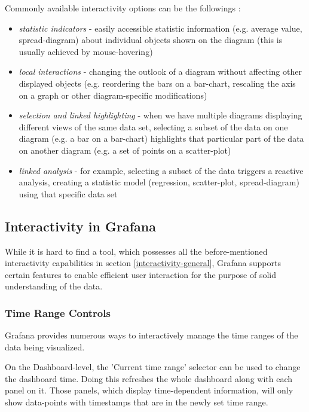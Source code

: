 Commonly available interactivity options can be the followings \cite{visual-analysis}:
\begin{itemize}
	\item \emph{statistic indicators} - easily accessible statistic information (e.g. average value, spread-diagram) about individual objects shown on the diagram (this is usually achieved by mouse-hovering)
	\item \emph{local interactions} - changing the outlook of a diagram without affecting other displayed objects (e.g. reordering the bars on a bar-chart, rescaling the axis on a graph or other diagram-specific modifications)
	\item \emph{selection and linked highlighting} - when we have multiple diagrams displaying different views of the same data set, selecting a subset of the data on one diagram (e.g. a bar on a bar-chart) highlights that particular part of the data on another diagram (e.g. a set of points on a scatter-plot)
	\item \emph{linked analysis} - for example, selecting a subset of the data triggers a reactive analysis, creating a statistic model (regression, scatter-plot, spread-diagram) using that specific data set
\end{itemize}

\subsection{Interactivity in Grafana}

While it is hard to find a tool, which possesses all the before-mentioned interactivity capabilities in section \ref{interactivity-general}, Grafana supports certain features to enable efficient user interaction for the purpose of solid understanding of the data.


\subsubsection{Time Range Controls} \label{grafana-time-range-controls}

Grafana provides numerous ways to interactively manage the time ranges of the data being visualized. \cite{grafana-time-range-controls}

On the Dashboard-level, the 'Current time range' selector can be used to change the dashboard time. Doing this refreshes the whole dashboard along with each panel on it. Those panels, which display time-dependent information, will only show data-points with timestamps that are in the newly set time range.

